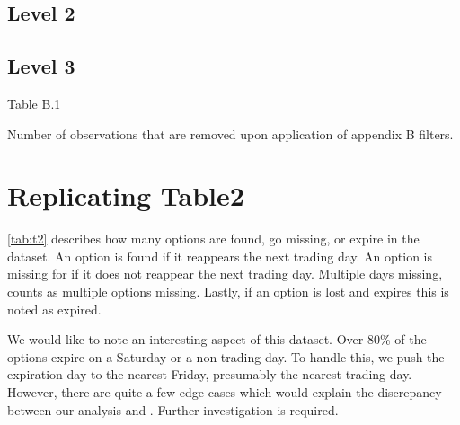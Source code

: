 \subsection {Level 2}

\subsection{Level 3} 

\newpage 

\thispagestyle{empty}
\begin{landscape}

\begin{table}

\centering
\caption{Table B.1}
\resizebox{1.4\textwidth}{!}{
\hspace*{-4cm}

}
\caption*{
  Number of observations that are removed upon application of appendix B filters. 
}
\label{table:tableB1}
\end{table}

\vfill
\raisebox{-4cm}{\makebox[\linewidth]{\thepage}}
\end{landscape}
\newpage






\section{Replicating Table2}
\autoref{tab:t2} describes how many options are found, go missing, or expire in the dataset. An option is found if it reappears the next trading day. An option is missing for if it does not reappear the next trading day. Multiple days missing, counts as multiple options missing. Lastly, if an option is lost and expires this is noted as expired. 

We would like to note an interesting aspect of this dataset. Over 80\% of the options expire on a Saturday or a non-trading day. To handle this, we push the expiration day to the nearest Friday, presumably the nearest trading day. However, there are quite a few edge cases which would explain the discrepancy between our analysis and \citet{constantinides2013}. Further investigation is required. 





